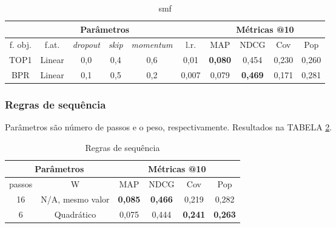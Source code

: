 \begin{table}[htbp]
  \centering
  \begin{tabular}{|c|c|c|c|c|c|c|c|c|c|}
    \hline
      \multicolumn{6}{|c|}{Parâmetros} & \multicolumn{4}{c|}{Métricas @10} \\
      \hline
      f. obj. & f.at. & \textit{dropout} & \textit{skip} & \textit{momentum} & l.r. & MAP & NDCG & Cov & Pop \\
      \hline
      TOP1 & Linear & 0,0 & 0,4 & 0,6 & 0,01 & \textbf{0,080} & 0,454 & 0,230 & 0,260 \\
      \hline
      BPR & Linear & 0,1 & 0,5 & 0,2 & 0,007 & 0,079 & \textbf{0,469} & 0,171 & 0,281 \\
      \hline
      \end{tabular}
      \caption{smf}
      \label{opt:smf_rem}
\end{table}

\subsubsection{Regras de sequência}
Parâmetros são número de passos e o peso, respectivamente. Resultados na TABELA
\ref{opt:sr_rem}.

\begin{table}[htbp]
  \centering
  \begin{tabular}{|c|c|c|c|c|c|}
    \hline
      \multicolumn{2}{|c|}{Parâmetros} & \multicolumn{4}{c|}{Métricas @10} \\
      \hline
      passos & W & MAP & NDCG & Cov & Pop \\
      \hline
      16 & N/A, mesmo valor & \textbf{0,085} & \textbf{0,466} & 0,219 & 0,282 \\
      \hline
      6 & Quadrático & 0,075 & 0,444 & \textbf{0,241} & \textbf{0,263} \\
      \hline
\end{tabular}
      \caption{Regras de sequência}
      \label{opt:sr_rem}
\end{table}

